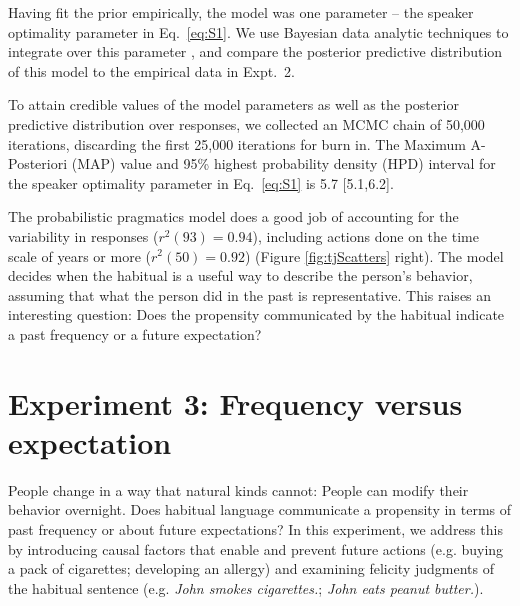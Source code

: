 \documentclass[10pt,letterpaper]{article}
\newcommand{\ndg}[1]{\textcolor{Green}{[ndg: #1]}}
\begin{document}
Having fit the prior empirically, the model was one parameter -- the speaker optimality parameter in Eq.~\ref{eq:S1}. 
We use Bayesian data analytic techniques to integrate over this parameter \cite{LW2014}, and compare the posterior predictive distribution of this model to the empirical data in Expt.~2.

To attain credible values of the model parameters as well as the posterior predictive distribution over responses, we collected an MCMC chain of 50,000 iterations, discarding the first 25,000 iterations for burn in.
The Maximum A-Posteriori (MAP) value and 95\% highest probability density (HPD) interval for the speaker optimality parameter in Eq.~\ref{eq:S1} is 5.7 [5.1,6.2].

The probabilistic pragmatics model does a good job of accounting for the variability in responses ($r^2(93) = 0.94$), including actions done on the time scale of years or more  ($r^2(50) = 0.92$) (Figure \ref{fig:tjScatters} right).
The model decides when the habitual is a useful way to describe the person's behavior, assuming that what the person did in the past is representative. 
This raises an interesting question: Does the propensity communicated by the habitual indicate a past frequency or a future expectation?


\section{Experiment 3: Frequency versus expectation}

People change in a way that natural kinds cannot: People can modify their behavior overnight.
Does habitual language communicate a propensity in terms of past frequency or about future expectations?
In this experiment, we address this by introducing causal factors that enable and prevent future actions (e.g. buying a pack of cigarettes; developing an allergy) and examining felicity judgments of the habitual sentence (e.g. \emph{John smokes cigarettes.}; \emph{John eats peanut butter.}).
\end{document}
